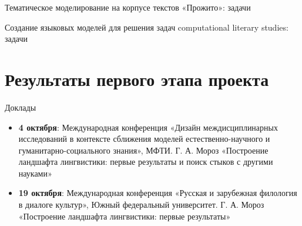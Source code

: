 \documentclass[
  13pt,
  ignorenonframetext,
]{beamer}
\providecommand{\tightlist}{%
  \setlength{\itemsep}{0pt}\setlength{\parskip}{0pt}}\usepackage{longtable,booktabs,array}
\begin{document}
\begin{frame}{Тематическое моделирование на корпусе текстов «Прожито»:
задачи}
\label{ux442ux435ux43cux430ux442ux438ux447ux435ux441ux43aux43eux435-ux43cux43eux434ux435ux43bux438ux440ux43eux432ux430ux43dux438ux435-ux43dux430-ux43aux43eux440ux43fux443ux441ux435-ux442ux435ux43aux441ux442ux43eux432-ux43fux440ux43eux436ux438ux442ux43e-ux437ux430ux434ux430ux447ux438}
\end{frame}

\begin{frame}{Создание языковых моделей для решения задач computational
literary studies: задачи}
\label{ux441ux43eux437ux434ux430ux43dux438ux435-ux44fux437ux44bux43aux43eux432ux44bux445-ux43cux43eux434ux435ux43bux435ux439-ux434ux43bux44f-ux440ux435ux448ux435ux43dux438ux44f-ux437ux430ux434ux430ux447-computational-literary-studies-ux437ux430ux434ux430ux447ux438}
\end{frame}

\section{Результаты первого этапа
проекта}\label{ux440ux435ux437ux443ux43bux44cux442ux430ux442ux44b-ux43fux435ux440ux432ux43eux433ux43e-ux44dux442ux430ux43fux430-ux43fux440ux43eux435ux43aux442ux430}

\begin{frame}{Доклады}
\label{ux434ux43eux43aux43bux430ux434ux44b}
\begin{itemize}
\tightlist
\item
  \textbf{4 октября}: Международная конференция «Дизайн
  междисциплинарных исследований в контексте сближения моделей
  естественно-научного и гуманитарно-социального знания», МФТИ. Г. А.
  Мороз «Построение ландшафта лингвистики: первые результаты и поиск
  стыков с другими науками»
\item
  \textbf{19 октября}: Международная конференция «Русская и зарубежная
  филология в диалоге культур», Южный федеральный университет. Г. А.
  Мороз «Построение ландшафта лингвистики: первые результаты»
\end{itemize}
\end{frame}
\end{document}
